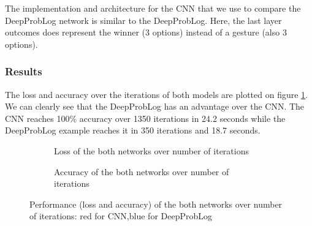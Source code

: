     The implementation and architecture for the CNN that we use to compare the DeepProbLog network is similar to the DeepProbLog. Here, the last layer outcomes does represent the winner (3 options) instead of a gesture (also 3 options).


\subsubsection{Results}
The loss and accuracy over the iterations of both models are plotted on figure \ref{fig:rps_output}. We can clearly see that the DeepProbLog has an advantage over the CNN. The CNN reaches 100\% accuracy over 1350 iterations in 24.2 seconds while the DeepProbLog example reaches it in 350 iterations and 18.7 seconds. 


\begin{figure}[h]
    \centering
    \begin{subfigure}[b]{0.49\textwidth}
        \caption{Loss of the both networks over number of iterations}
    \end{subfigure}
    \hfill
    \begin{subfigure}[b]{0.49\textwidth}
        \caption{Accuracy of the both networks over number of iterations}
    \end{subfigure}
    \caption{Performance (loss and accuracy) of the both networks over number of iterations: red for CNN,blue for DeepProbLog}
    \label{fig:rps_output}
\end{figure}  
